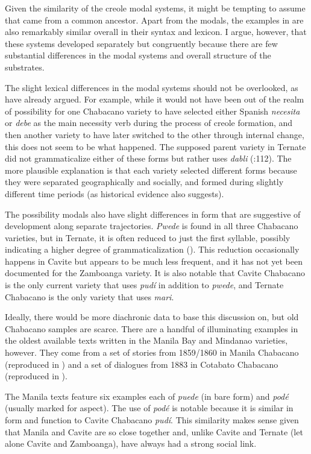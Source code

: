 Given the similarity of the creole modal systems, it might be tempting to assume that came from a common ancestor. Apart from the modals, the examples in  are also remarkably similar overall in their syntax and lexicon. I argue, however, that these systems developed separately but congruently because there are few substantial differences in the modal systems and overall structure of the substrates. 

The slight lexical differences in the modal systems should not be overlooked, as \citet{SippolaLesho2020} have already argued. For example, while it would not have been out of the realm of possibility for one Chabacano variety to have selected either Spanish \textit{necesita} or \textit{debe} as the main necessity verb during the process of creole formation, and then another variety to have later switched to the other through internal change, this does not seem to be what happened. The supposed parent variety in Ternate did not grammaticalize either of these forms but rather uses \textit{dabli} (\citealt{SippolaLesho2020}:112). The more plausible explanation is that each variety selected different forms because they were separated geographically and socially, and formed during slightly different time periods (as historical evidence also suggests). 

The possibility modals also have slight differences in form that are suggestive of development along separate trajectories. \textit{Pwede} is found in all three Chabacano varieties, but in Ternate, it is often reduced to just the first syllable, possibly indicating a higher degree of grammaticalization (\citealt{SippolaLesho2020}). This reduction occasionally happens in Cavite but appears to be much less frequent, and it has not yet been documented for the Zamboanga variety. It is also notable that Cavite Chabacano is the only current variety that uses \textit{pudí} in addition to \textit{pwede}, and Ternate Chabacano is the only variety that uses \textit{mari}.

Ideally, there would be more diachronic data to base this discussion on, but old Chabacano samples are scarce. There are a handful of illuminating examples in the oldest available texts written in the Manila Bay and Mindanao varieties, however. They come from a set of stories from 1859/1860 in Manila Chabacano (reproduced in \citealt{FernándezSippola2017}) and a set of dialogues from 1883 in Cotabato Chabacano (reproduced in \citealt{Fernández2012b}). 

The Manila texts feature six examples each of \textit{puede} (in bare form) and \textit{podé} (usually marked for aspect). The use of \textit{podé} is notable because it is similar in form and function to Cavite Chabacano \textit{pudí}. This similarity makes sense given that Manila and Cavite are so close together and, unlike Cavite and Ternate (let alone Cavite and Zamboanga), have always had a strong social link. 

